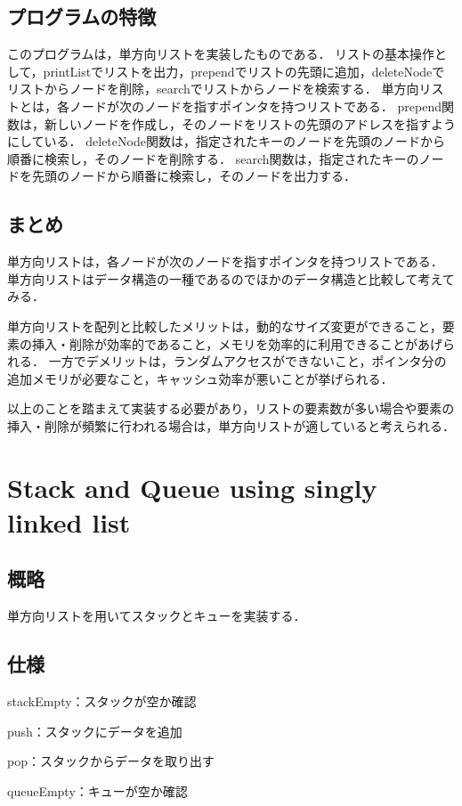\documentclass{ltjsarticle}
\begin{document}
\subsection{プログラムの特徴}
このプログラムは，単方向リストを実装したものである．
リストの基本操作として，printListでリストを出力，prependでリストの先頭に追加，deleteNodeでリストからノードを削除，searchでリストからノードを検索する．
単方向リストとは，各ノードが次のノードを指すポインタを持つリストである．
prepend関数は，新しいノードを作成し，そのノードをリストの先頭のアドレスを指すようにしている．
deleteNode関数は，指定されたキーのノードを先頭のノードから順番に検索し，そのノードを削除する．
search関数は，指定されたキーのノードを先頭のノードから順番に検索し，そのノードを出力する．

\subsection{まとめ}
単方向リストは，各ノードが次のノードを指すポインタを持つリストである．
単方向リストはデータ構造の一種であるのでほかのデータ構造と比較して考えてみる．

単方向リストを配列と比較したメリットは，動的なサイズ変更ができること，要素の挿入・削除が効率的であること，メモリを効率的に利用できることがあげられる．
一方でデメリットは，ランダムアクセスができないこと，ポインタ分の追加メモリが必要なこと，キャッシュ効率が悪いことが挙げられる．

以上のことを踏まえて実装する必要があり，リストの要素数が多い場合や要素の挿入・削除が頻繁に行われる場合は，単方向リストが適していると考えられる．

\section{Stack and Queue using singly linked list}
\subsection{概略}
単方向リストを用いてスタックとキューを実装する．

\subsection{仕様}
\noindent stackEmpty：スタックが空か確認

\noindent push：スタックにデータを追加

\noindent pop：スタックからデータを取り出す

\noindent queueEmpty：キューが空か確認
\end{document}
